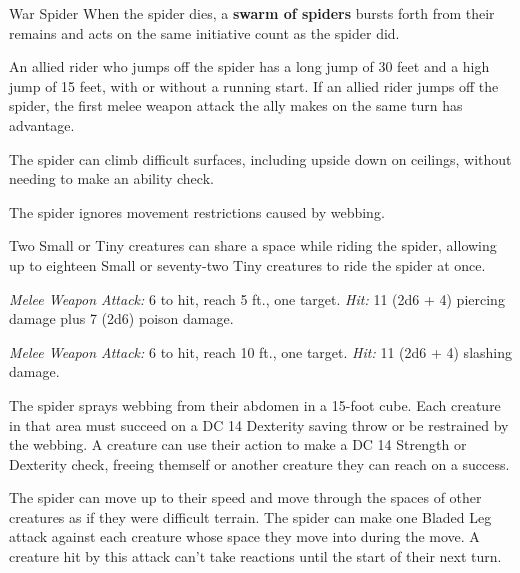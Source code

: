 \documentclass[10pt,a4paper,twoside,bg=print,twocolumn,openany,nodeprecatedcode]{dndbook}
\begin{document}
\begin{DndMonster}[float=t]{War Spider}
\DndMonsterBasics[
armor-class = {15 (natural armor)},
hit-points = {\DndDice{7d12 + 28}},
speed = {40 ft., climb 40 ft.}
]
\DndMonsterAbilityScores[
 str = 18,
 dex = 14,
 con = 18,
 int = 2,
 wis = 11,
 cha = 4
]
\DndMonsterDetails[
senses = {blindsight 10 ft., darkvision 60 ft., passive perception 10},
challenge = 3,
]
When the spider dies, a \textbf{swarm of spiders} bursts forth from their remains and acts on the same initiative count as the spider did.

An allied rider who jumps off the spider has a long jump of 30 feet and a high jump of 15 feet, with or without a running start. If an allied rider jumps off the spider, the first melee weapon attack the ally makes on the same turn has advantage.

The spider can climb difficult surfaces, including upside down on ceilings, without needing to make an ability check.

The spider ignores movement restrictions caused by webbing.

Two Small or Tiny creatures can share a space while riding the spider, allowing up to eighteen Small or seventy-two Tiny creatures to ride the spider at once.

\textsl{Melee Weapon Attack:} 6 to hit, reach 5 ft., one target. \textsl{Hit:} 11 (2d6 + 4) piercing damage plus 7 (2d6) poison damage.

\textsl{Melee Weapon Attack:} 6 to hit, reach 10 ft., one target. \textsl{Hit:} 11 (2d6 + 4) slashing damage.

The spider sprays webbing from their abdomen in a 15-foot cube. Each creature in that area must succeed on a DC 14 Dexterity saving throw or be restrained by the webbing. A creature can use their action to make a DC 14 Strength or Dexterity check, freeing themself or another creature they can reach on a success.

The spider can move up to their speed and move through the spaces of other creatures as if they were difficult terrain. The spider can make one Bladed Leg attack against each creature whose space they move into during the move. A creature hit by this attack can't take reactions until the start of their next turn.

\end{DndMonster}
\end{document}
